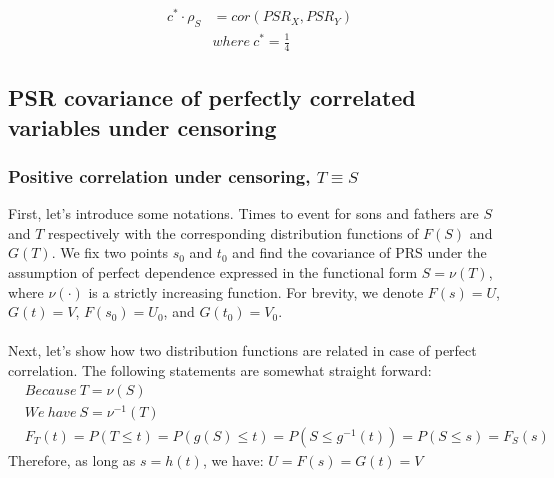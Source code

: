\documentclass[]{article}
\begin{document}
	$$
	\begin{aligned}
		c^* \cdot \rho_S &= cor(PSR_X, PSR_Y)\\
    & where~c^*=\frac{1}{4}
	\end{aligned}
	$$
  
\subsection{PSR covariance of perfectly correlated variables under censoring}
\subsubsection{Positive correlation under censoring, $T\equiv S$}
First, let's introduce some notations. Times to event for sons and fathers are $S$ and $T$ respectively with the corresponding distribution functions of $F(S)$ and $G(T)$. We fix two points $s_0$ and $t_0$ and find the covariance of PRS under the assumption of perfect dependence expressed in the functional form $S =\nu( T)$, where $\nu(\cdot)$ is a strictly increasing function. For brevity, we denote $F(s)=U$, $G(t)=V$, $F(s_0)=U_0$, and $G(t_0)=V_0$.\\
~\\

Next, let's show how two distribution functions are related in case of perfect correlation. The following statements are somewhat straight forward:
	$$
	\begin{aligned}
    &Because~T = \nu(S)\\
    &We~have~S = \nu^{-1}(T)\\
    &F_T(t) = P(T \leq t) = P\left(g(S) \leq t\right) = P(S\leq g^{-1}(t)) = P(S\leq s) = F_S(s) 
	\end{aligned}
	$$
Therefore, as long as $s=h(t)$, we have: $U=F(s) = G(t) = V$
\end{document}
